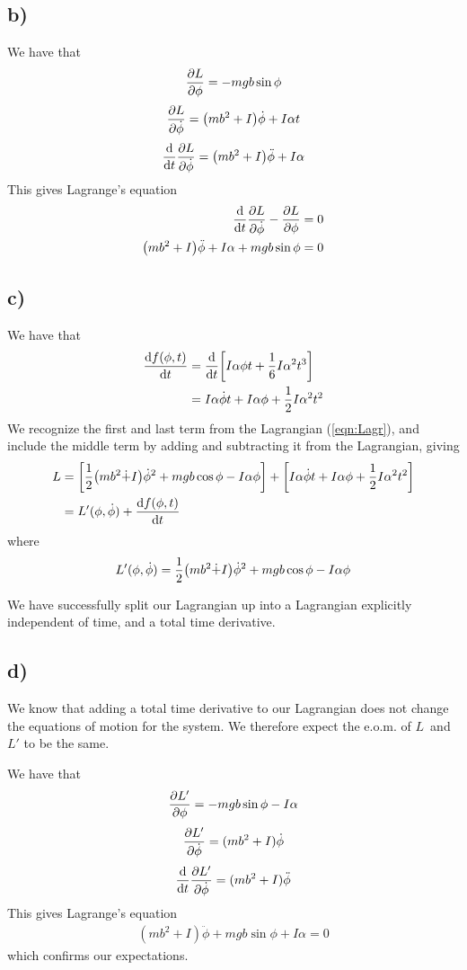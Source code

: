 \documentclass[12p,a4paper]{article}
\newcommand{\half}{\frac{1}{2}}
\begin{document}
\subsection*{b)}
We have that
\[
    \pdv{L}{\phi} = -mgb\sin{\phi}
\]
\[
    \pdv{L}{\dot{\phi}} = \qty(mb^2 + I)\dot{\phi} + I \alpha t
\]
\[
    \dv{t}\pdv{L}{\dot{\phi}} = \qty(mb^2 + I)\ddot{\phi} + I\alpha
\]
This gives Lagrange's equation
\begin{align*}
    \dv{t}\pdv{L}{\dot{\phi}} - \pdv{L}{\phi} = 0 \\
    \qty(mb^2 + I)\ddot{\phi} + I\alpha + mgb\sin{\phi} = 0
\end{align*}


\subsection*{c)}
We have that
\begin{align*}
    \dv{f(\phi, t)}{t} &= \dv{t}\qty[I\alpha\phi t + \frac{1}{6} I \alpha^2t^3] \\
    &= I\alpha\dot{\phi}t + I\alpha\phi + \half I \alpha^2t^2
\end{align*}
We recognize the first and last term from the Lagrangian (\ref{eqn:Lagr}), and include the middle term by adding and subtracting it from the Lagrangian, giving
\begin{align*}
    L &= \qty[ \half \qty(m b^2\dot + I)\dot{\phi}^2 + mgb\cos{\phi} - I\alpha\phi ] + \qty[ I\alpha\dot{\phi}t + I\alpha\phi + \half I \alpha^2t^2 ] \\
    &= L'(\phi, \dot{\phi}) + \dv{f(\phi, t)}{t}
\end{align*}
where
\begin{align}
    L'(\phi, \dot{\phi}) = \half \qty(m b^2\dot + I)\dot{\phi}^2 + mgb\cos{\phi} - I\alpha\phi
\end{align}

We have successfully split our Lagrangian up into a Lagrangian explicitly independent of time, and a total time derivative.



\subsection*{d)}
We know that adding a total time derivative to our Lagrangian does not change the equations of motion for the system. We therefore expect the e.o.m. of $L$ and $L'$ to be the same.

We have that
\begin{align*}
    \pdv{L'}{\phi} = -mgb\sin{\phi} - I\alpha
\end{align*}
\begin{align*}
    \pdv{L'}{\dot{\phi}} = (mb^2 + I)\dot{\phi}
\end{align*}
\begin{align*}
    \dv{t}\pdv{L'}{\dot{\phi}} = (mb^2 + I)\ddot{\phi}
\end{align*}
This gives Lagrange's equation
\begin{align*}
    (mb^2 + I)\ddot{\phi} + mgb\sin{\phi} + I\alpha = 0
\end{align*}
which confirms our expectations.
\end{document}
